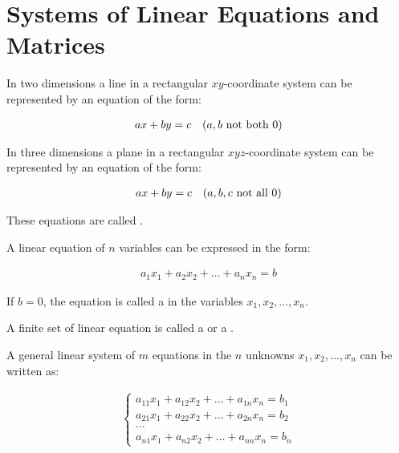 \chapter{Systems of Linear Equations and Matrices}



    \par In two dimensions a line in a rectangular $xy$-coordinate system
    can be represented by an equation of the form:

    \begin{align*}
      ax + by = c \quad (a, b \mbox{ not both } 0)
    \end{align*}

    \par In three dimensions a plane in a rectangular $xyz$-coordinate
    system can be represented by an equation of the form:

    \begin{align*}
      ax + by = c \quad (a, b, c \mbox{ not all } 0)
    \end{align*}

    \par These equations are called .

    \par A linear equation of $n$ variables can be expressed in the form:

    \begin{align*}
      a_{1}x_{1} + a_{2}x_{2} + \ldots + a_{n}x_{n} = b
    \end{align*}

    \par If $b = 0$, the equation is called a  in the variables $x_{1}, x_{2}, \ldots, x_{n}$.

    \par A finite set of linear equation is called a  or a .

    \par A general linear system of $m$ equations in the $n$ unknowns
    $x_{1}, x_{2}, \ldots, x_{n}$ can be written as:

    \begin{align*}
      \begin{cases}
        a_{11}x_{1} + a_{12}x_{2} + \ldots + a_{1n}x_{n} = b_{1} \\
        a_{21}x_{1} + a_{22}x_{2} + \ldots + a_{2n}x_{n} = b_{2} \\
        \ldots \\
        a_{n1}x_{1} + a_{n2}x_{2} + \ldots + a_{nn}x_{n} = b_{n}
      \end{cases}
    \end{align*}

